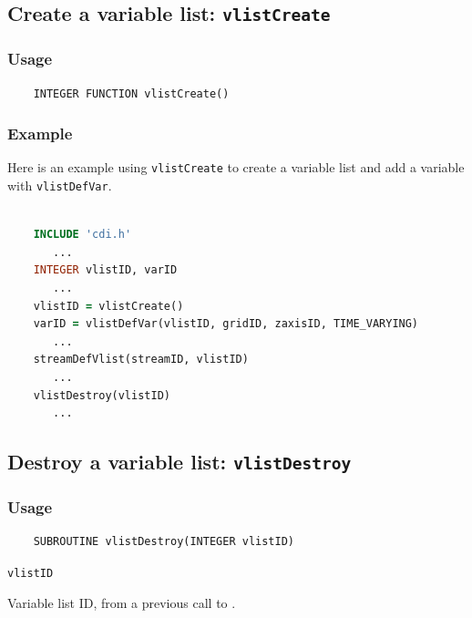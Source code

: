 

\subsection{Create a variable list: \texttt{vlistCreate}}
\label{vlistCreate}
\subsubsection*{Usage}

\begin{verbatim}
    INTEGER FUNCTION vlistCreate()
\end{verbatim}

\subsubsection*{Example}

Here is an example using {\texttt{vlistCreate}} to create a variable list
and add a variable with {\texttt{vlistDefVar}}.

\begin{lstlisting}[language=Fortran, backgroundcolor=\color{pyellow}, basicstyle=\small, columns=flexible]

    INCLUDE 'cdi.h'
       ...
    INTEGER vlistID, varID
       ...
    vlistID = vlistCreate()
    varID = vlistDefVar(vlistID, gridID, zaxisID, TIME_VARYING)
       ...
    streamDefVlist(streamID, vlistID)
       ...
    vlistDestroy(vlistID)
       ...
\end{lstlisting}


\subsection{Destroy a variable list: \texttt{vlistDestroy}}
\label{vlistDestroy}
\subsubsection*{Usage}

\begin{verbatim}
    SUBROUTINE vlistDestroy(INTEGER vlistID)
\end{verbatim}

\hspace*{4mm}\begin{minipage}[]{15cm}
\begin{deflist}{\texttt{vlistID}\ }
\item[\texttt{vlistID}]
Variable list ID, from a previous call to {}.

\end{deflist}
\end{minipage}


